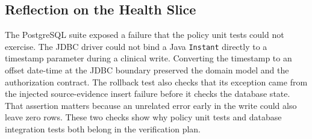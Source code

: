 \subsection{Reflection on the Health Slice}\label{sec:m2-health-reflection}

The PostgreSQL suite exposed a failure that the policy unit tests could
not exercise. The JDBC driver could not bind a Java \texttt{Instant}
directly to a timestamp parameter during a clinical write. Converting
the timestamp to an offset date-time at the JDBC boundary preserved
the domain model and the authorization contract. The rollback test
also checks that its exception came from the injected source-evidence
insert failure before it checks the database state. That assertion
matters because an unrelated error early in the write could also
leave zero rows. These two checks show why policy unit tests and
database integration tests both belong in the verification plan.
